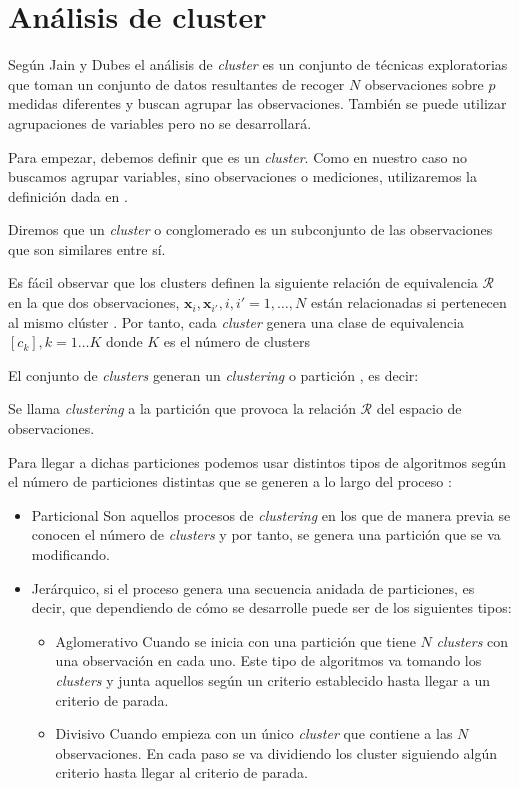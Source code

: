 \section{Análisis de cluster}

\noindent Según Jain y Dubes  el análisis de \emph{cluster} es un conjunto de técnicas exploratorias que toman un conjunto de datos resultantes de recoger $N$ observaciones sobre $p$ medidas diferentes y buscan agrupar las observaciones. También se puede utilizar agrupaciones de variables pero no se desarrollará.

\noindent Para empezar, debemos definir que es un \emph{cluster}. Como en nuestro caso no buscamos agrupar variables, sino observaciones o mediciones, utilizaremos la definición dada en \cite{Everitt 2011}.

\begin{defi}
Diremos que un \emph{cluster} o conglomerado es un subconjunto de las observaciones que son similares entre sí. 
\end{defi}

\noindent Es fácil observar que los clusters definen la siguiente relación de equivalencia $\mathcal{R}$ en la que dos observaciones, $\mathbf{x}_i,\mathbf{x}_{i'}, i,i'=1, \ldots, N$ están relacionadas si pertenecen al mismo clúster \cite{Cuadras 2014}. Por tanto, cada \emph{cluster} genera una clase de equivalencia $[c_k], k=1\ldots K$ donde $K$ es el número de clusters

\noindent El conjunto de \emph{clusters} generan un \emph{clustering} o partición , es decir:
\begin{defi}
Se llama \textit{clustering} a la partición que provoca la relación $\mathcal{R}$ del espacio de observaciones. 
\end{defi}

\noindent Para llegar a dichas particiones podemos usar distintos tipos de algoritmos según el número de particiones distintas que se generen a lo largo del proceso \cite{Jain 1988}:
\begin{itemize}
\item Particional Son aquellos procesos de \emph{clustering} en los que de manera previa se conocen el número de \emph{clusters} y por tanto, se genera una partición que se va modificando.
\item Jerárquico, si el proceso genera una secuencia anidada de particiones, es decir, que dependiendo de cómo se desarrolle puede ser de los siguientes tipos:
\begin{itemize}
\item Aglomerativo Cuando se inicia con una partición que tiene $N$ \emph{clusters} con una observación en cada uno. Este tipo de algoritmos va tomando los \emph{clusters} y junta aquellos según un criterio establecido hasta llegar a un criterio de parada. 
\item Divisivo Cuando empieza con un único \emph{cluster} que contiene a las $N$ observaciones. En cada paso se va dividiendo los cluster siguiendo algún criterio hasta llegar al criterio de parada. 
\end{itemize}
\end{itemize}

